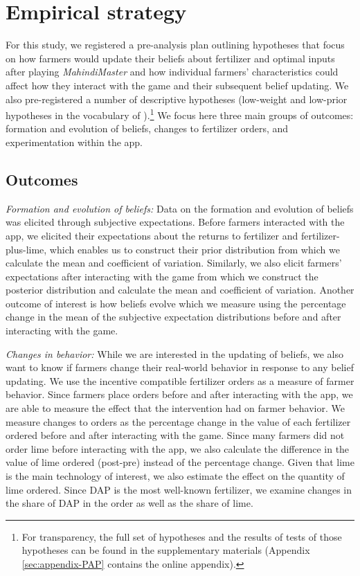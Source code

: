 \documentclass[12pt,letterpaper]{article}
\begin{document}
\section{Empirical strategy}\label{sec:empirical_strategy}
 
For this study, we registered a pre-analysis plan outlining hypotheses that focus on how farmers would update their beliefs about fertilizer and optimal inputs after playing \textit{MahindiMaster} and how individual farmers' characteristics could affect how they interact with the game and their subsequent belief updating. We also pre-registered a number of descriptive hypotheses (low-weight and low-prior hypotheses in the vocabulary of \cite{anderson_split-sample_2017}).\footnote{For transparency, the full set of hypotheses and the results of tests of those hypotheses can be found in the supplementary materials (Appendix \ref{sec:appendix-PAP} contains the online appendix).} We focus here three main groups of outcomes: formation and evolution of beliefs, changes to fertilizer orders, and experimentation within the app. 
 
\subsection{Outcomes}
 
\textit{Formation and evolution of beliefs:} Data on the formation and evolution of beliefs was elicited through subjective expectations. Before farmers interacted with the app, we elicited their expectations about the returns to fertilizer and fertilizer-plus-lime, which enables us to construct their prior distribution from which we calculate the mean and coefficient of variation. Similarly, we also elicit farmers' expectations after interacting with the game from which we construct the posterior distribution and calculate the mean and coefficient of variation. Another outcome of interest is how beliefs evolve which we measure using the percentage change in the mean of the subjective expectation distributions before and after interacting with the game. 
 
\textit{Changes in behavior:} While we are interested in the updating of beliefs, we also want to know if farmers change their real-world behavior in response to any belief updating. We use the incentive compatible fertilizer orders as a measure of farmer behavior. Since farmers place orders before and after interacting with the app, we are able to measure the effect that the intervention had on farmer behavior. We measure changes to orders as the percentage change in the value of each fertilizer ordered before and after interacting with the game. Since many farmers did not order lime before interacting with the app, we also calculate the difference in the value of lime ordered (post-pre) instead of the percentage change. Given that lime is the main technology of interest, we also estimate the effect on the quantity of lime ordered. Since DAP is the most well-known fertilizer, we examine changes in the share of DAP in the order as well as the share of lime. 
 
\end{document}
